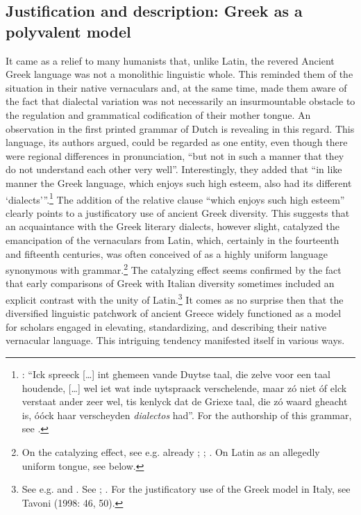 \subsection{Justification and description: Greek as a polyvalent model}\label{sec:8.1.2}

It came as a relief to many humanists that, unlike Latin, the revered Ancient Greek language was not a monolithic linguistic whole. This reminded them of the situation in their native vernaculars and, at the same time, made them aware of the fact that dialectal variation was not necessarily an insurmountable obstacle to the regulation and grammatical codification of their mother tongue. An observation in the first printed grammar of Dutch is revealing in this regard. This language, its authors argued, could be regarded as one entity, even though there were regional differences in pronunciation, “but not in such a manner that they do not understand each other very well”. Interestingly, they added that “in like manner the Greek language, which enjoys such high esteem, also had its different ‘dialects’”.\footnote{\citet[110]{[spieghel]1584}: “Ick spreeck […] int ghemeen vande Duytse taal, die zelve voor een taal houdende, […] wel iet wat inde uytspraack verschelende, maar zó niet óf elck verstaat ander zeer wel, tis kenlyck dat de Griexe taal, die zó waard gheacht is, óóck haar verscheyden \textit{dialectos} had”. For the authorship of this grammar, see \citet{Peeters1982}.} The addition of the relative clause “which enjoys such high esteem” clearly points to a justificatory use of ancient Greek diversity. This suggests that an acquaintance with the Greek literary dialects, however slight, catalyzed the emancipation of the vernaculars from Latin, which, certainly in the fourteenth and fifteenth centuries, was often conceived of as a highly uniform language synonymous with grammar.\footnote{On the catalyzing effect, see e.g. already \citet[688]{Bonfante1953}; \citet[9]{Trapp1990}; \citet[67]{Rhodes2015}. On Latin as an allegedly uniform tongue, see  below.} The catalyzing effect seems confirmed by the fact that early comparisons of Greek with Italian diversity sometimes included an explicit contrast with the unity of Latin.\footnote{See e.g. \citet[\textsc{ii}.41]{Landino1974} and \citet[*.ii\textsc{\textsuperscript{v}}]{Manutius1496}. See \citet[172--173]{Alinei1984}; \citet[209--210, 215]{Trovato1984}. For the justificatory use of the Greek model in Italy, see Tavoni (1998: 46, 50).} It comes as no surprise then that the diversified linguistic patchwork of ancient Greece widely functioned as a model for scholars engaged in elevating, standardizing, and describing their native vernacular language. This intriguing tendency manifested itself in various ways.

